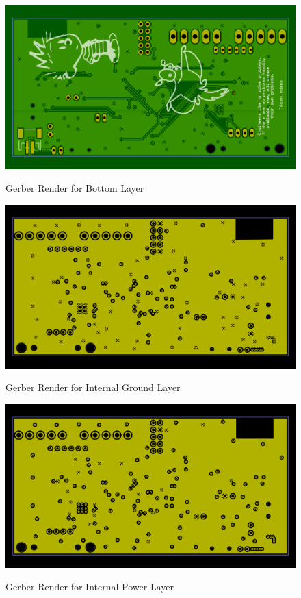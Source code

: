 \begin{figure}
\begin{center}
	\label{fig:BOTGerber}
	\includegraphics[angle=0,scale=1,width=1\textwidth]{Images/Rev5_BOTGERB.png} 
	\caption{Gerber Render for Bottom Layer}
\end{center}
\end{figure}


\begin{figure}
\begin{center}
	\label{fig:GNDGerber}
	\includegraphics[angle=0,scale=1,width=1\textwidth]{Images/Rev5_GNDGERB.png} 
	\caption{Gerber Render for Internal Ground Layer}
\end{center}
\end{figure}


\begin{figure}
\begin{center}
	\label{fig:PWRGerber}
	\includegraphics[angle=0,scale=1,width=1\textwidth]{Images/Rev5_PWRGERB.png} 
	\caption{Gerber Render for Internal Power Layer}
\end{center}
\end{figure}
